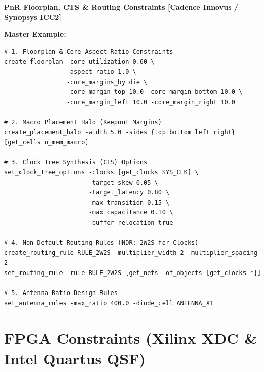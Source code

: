 \documentclass[11pt,a4paper]{article}
\newenvironment{cmdbox}[2]{%
  \begin{mdframed}[style=cmdstyle]%
  {\bfseries\sffamily\color{primary}#1 \hfill \footnotesize\color{mutedgray}[#2]}\par\vspace{3pt}%
}{%
  \end{mdframed}%
}
\begin{document}
\begin{cmdbox}{PnR Floorplan, CTS \& Routing Constraints}{Cadence Innovus / Synopsys ICC2}
\textbf{Master Example:}
\begin{lstlisting}[style=sdcstyle]
# 1. Floorplan & Core Aspect Ratio Constraints
create_floorplan -core_utilization 0.60 \
                 -aspect_ratio 1.0 \
                 -core_margins_by die \
                 -core_margin_top 10.0 -core_margin_bottom 10.0 \
                 -core_margin_left 10.0 -core_margin_right 10.0

# 2. Macro Placement Halo (Keepout Margins)
create_placement_halo -width 5.0 -sides {top bottom left right} [get_cells u_mem_macro]

# 3. Clock Tree Synthesis (CTS) Options
set_clock_tree_options -clocks [get_clocks SYS_CLK] \
                       -target_skew 0.05 \
                       -target_latency 0.80 \
                       -max_transition 0.15 \
                       -max_capacitance 0.10 \
                       -buffer_relocation true

# 4. Non-Default Routing Rules (NDR: 2W2S for Clocks)
create_routing_rule RULE_2W2S -multiplier_width 2 -multiplier_spacing 2
set_routing_rule -rule RULE_2W2S [get_nets -of_objects [get_clocks *]]

# 5. Antenna Ratio Design Rules
set_antenna_rules -max_ratio 400.0 -diode_cell ANTENNA_X1
\end{lstlisting}
\end{cmdbox}

\section{FPGA Constraints (Xilinx XDC \& Intel Quartus QSF)}
\end{document}
